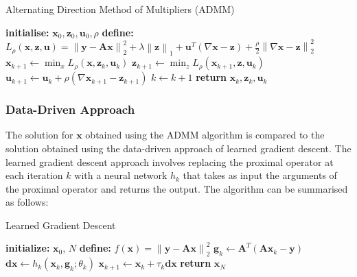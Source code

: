 \documentclass[11pt]{article}
\begin{document}
\begin{algorithm}[H]
\caption{Alternating Direction Method of Multipliers (ADMM)}
\begin{algorithmic}[1]
\State \textbf{initialise:} $\mathbf{x}_0, \mathbf{z}_0, \mathbf{u}_0, \rho$
\State \textbf{define:} $L_\rho(\mathbf{x}, \mathbf{z}, \mathbf{u}) = \left\| \mathbf{y} - \mathbf{A} \mathbf{x} \right\|_2^2 + \lambda \left\| \mathbf{z} \right\|_1 + \mathbf{u}^T (\nabla \mathbf{x}-\mathbf{z})+\frac{\rho}{2} \left\| \nabla \mathbf{x} - \mathbf{z}\right\|_2^2$  
    \State $\mathbf{x}_{k+1} \gets \min_x L_\rho(\mathbf{x}, \mathbf{z}_k, \mathbf{u}_k)$ 
    \State $\mathbf{z}_{k+1} \gets \min_z L_\rho(\mathbf{x}_{k+1}, \mathbf{z}, \mathbf{u}_k)$ 
    \State $\mathbf{u}_{k+1} \gets \mathbf{u}_k + \rho (\nabla \mathbf{x}_{k+1} - \mathbf{z}_{k+1})$ 
    \State $k \gets k + 1$
\EndWhile
\State \textbf{return} $\mathbf{x}_k, \mathbf{z}_k, \mathbf{u}_k$
\end{algorithmic}
\end{algorithm}

\subsubsection{Data-Driven Approach}
The solution for \( \mathbf{x} \) obtained using the ADMM algorithm is compared to the solution obtained using the data-driven approach of learned gradient descent. The learned gradient descent approach involves replacing the proximal operator at each iteration \(k\) with a neural network \(h_k\) that takes as input the arguments of the proximal operator and returns the output. The algorithm can be summarised as follows:


\begin{algorithm}[H]
    \caption{Learned Gradient Descent}
    \begin{algorithmic}[1]
    \State \textbf{initialize:} $\mathbf{x}_0$, $N$
    \State \textbf{define:} $f(\mathbf{x}) = \left\| \mathbf{y} - \mathbf{A} \mathbf{x} \right\|_2^2$ 
        \State $\mathbf{g}_k \gets \mathbf{A}^T(\mathbf{A}\mathbf{x}_k - \mathbf{y})$ 
        \State $\mathbf{dx} \gets h_k(\mathbf{x}_k, \mathbf{g}_k; \theta_k)$ 
        \State $\mathbf{x}_{k+1} \gets \mathbf{x}_k + \tau_k \mathbf{dx}$ 
    \EndFor
    \State \textbf{return} $\mathbf{x}_N$
    \end{algorithmic}
    \end{algorithm}
\end{document}
